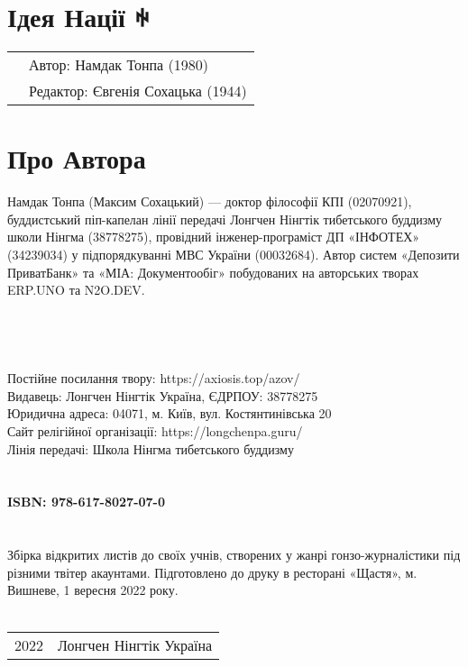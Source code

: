 \section*{Ідея Нації ꑭ}

\begin{tabular}{ll}
& Автор: Намдак Тонпа (1980)\\
& Редактор: Євгенія Сохацька (1944)\\
\end{tabular}

\section*{Про Автора}

Намдак Тонпа (Максим Сохацький) --- доктор філософії КПІ (02070921),
буддистський піп-капелан лінії передачі
Лонгчен Нінгтік тибетського буддизму школи Нінгма (38778275),
провідний інженер-програміст ДП «ІНФОТЕХ» (34239034)
у підпорядкуванні МВС України (00032684).
Автор систем «Депозити ПриватБанк» та «МІА: Документообіг»
побудованих на авторських творах ERP.UNO та N2O.DEV.
\\
\\
\\
\\
\\
Постійне посилання твору: https://axiosis.top/azov/ \\
Видавець: Лонгчен Нінгтік Україна, ЄДРПОУ: 38778275 \\
Юридична адреса: 04071, м. Київ, вул. Костянтинівська 20 \\
Сайт релігійної організації: https://longchenpa.guru/ \\
Лінія передачі: Школа Нінгма тибетського буддизму \\
\\
\\
{\bf ISBN: 978-617-8027-07-0 \hspace{2em}} \\
\\
\\
\indent Збірка відкритих листів до своїх учнів, створених у жанрі гонзо-журналістики під різними твітер акаунтами.
Підготовлено до друку в ресторані «Щастя»,
м. Вишневе, 1 вересня 2022 року. \\
\\

\begin{tabular}{ll}
\textcopyright{} 2022 & Лонгчен Нінгтік Україна
\end{tabular}
